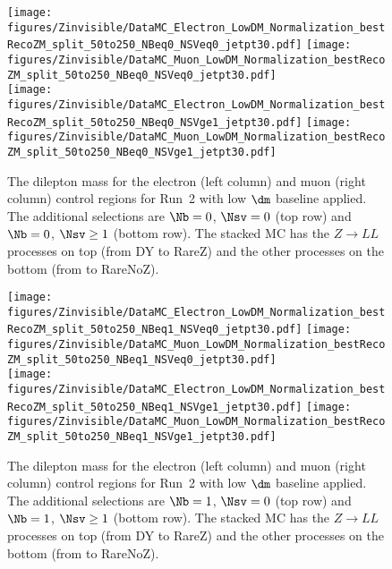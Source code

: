 \begin{figure}[tbp]
{
\centering
\texttt{[image: figures/Zinvisible/DataMC\_Electron\_LowDM\_Normalization\_bestRecoZM\_split\_50to250\_NBeq0\_NSVeq0\_jetpt30.pdf]}
\texttt{[image: figures/Zinvisible/DataMC\_Muon\_LowDM\_Normalization\_bestRecoZM\_split\_50to250\_NBeq0\_NSVeq0\_jetpt30.pdf]} \\
\texttt{[image: figures/Zinvisible/DataMC\_Electron\_LowDM\_Normalization\_bestRecoZM\_split\_50to250\_NBeq0\_NSVge1\_jetpt30.pdf]}
\texttt{[image: figures/Zinvisible/DataMC\_Muon\_LowDM\_Normalization\_bestRecoZM\_split\_50to250\_NBeq0\_NSVge1\_jetpt30.pdf]}
\caption[The dilepton mass for the electron and muon control regions for Run~2 with low $\dm$ baseline applied]
{
    The dilepton mass for the electron (left column) and muon (right column) control regions for Run~2 with low $\dm$ baseline applied.
    The additional selections are $\Nb=0$, $\Nsv=0$ (top row) and $\Nb=0$, $\Nsv\ge1$ (bottom row).
    The stacked MC has the $Z \to LL$ processes on top (from DY to RareZ) and the other processes on the bottom (from \ttbar to RareNoZ).
}
\label{fig:zmass_lowdm_1}
}
\end{figure}

\begin{figure}[tbp]
{
\centering
\texttt{[image: figures/Zinvisible/DataMC\_Electron\_LowDM\_Normalization\_bestRecoZM\_split\_50to250\_NBeq1\_NSVeq0\_jetpt30.pdf]}
\texttt{[image: figures/Zinvisible/DataMC\_Muon\_LowDM\_Normalization\_bestRecoZM\_split\_50to250\_NBeq1\_NSVeq0\_jetpt30.pdf]} \\
\texttt{[image: figures/Zinvisible/DataMC\_Electron\_LowDM\_Normalization\_bestRecoZM\_split\_50to250\_NBeq1\_NSVge1\_jetpt30.pdf]}
\texttt{[image: figures/Zinvisible/DataMC\_Muon\_LowDM\_Normalization\_bestRecoZM\_split\_50to250\_NBeq1\_NSVge1\_jetpt30.pdf]}
\caption[The dilepton mass for the electron and muon control regions for Run~2 with low $\dm$ baseline applied]
{
    The dilepton mass for the electron (left column) and muon (right column) control regions for Run~2 with low $\dm$ baseline applied.
    The additional selections are $\Nb=1$, $\Nsv=0$ (top row) and $\Nb=1$, $\Nsv\ge1$ (bottom row).
    The stacked MC has the $Z \to LL$ processes on top (from DY to RareZ) and the other processes on the bottom (from \ttbar to RareNoZ).
}
\label{fig:zmass_lowdm_2}
}
\end{figure}

